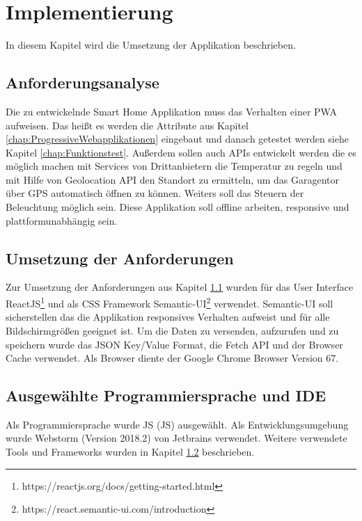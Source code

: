 \chapter{Implementierung}\label{chap:Implementierung}
\thispagestyle{standard}
\pagestyle{standard}

In diesem Kapitel wird die Umsetzung der Applikation beschrieben.

\section{Anforderungsanalyse}\label{sub:Anforderungsanalyse}
Die zu entwickelnde Smart Home Applikation muss das Verhalten einer \acs{PWA} aufweisen. Das heißt es werden die Attribute aus Kapitel \ref{chap:ProgressiveWebapplikationen} eingebaut und danach getestet werden siehe Kapitel \ref{chap:Funktionstest}. Außerdem sollen auch APIs entwickelt werden die es möglich machen mit Services von Drittanbietern die Temperatur zu regeln und mit Hilfe von Geolocation API den Standort zu ermitteln, um das Garagentor über GPS automatisch öffnen zu können. Weiters soll das Steuern der Beleuchtung möglich sein. Diese Applikation soll offline arbeiten, responsive und plattformunabhängig sein.

\section{Umsetzung der Anforderungen}\label{sub:Umsetzung der Anforderungen}
Zur Umsetzung der Anforderungen aus Kapitel \ref{sub:Anforderungsanalyse} wurden für das User Interface ReactJS\footnote{https://reactjs.org/docs/getting-started.html} und als CSS Framework Semantic-UI\footnote{https://react.semantic-ui.com/introduction} verwendet. Semantic-UI soll sicherstellen das die Applikation responsives Verhalten aufweist und für alle Bildschirmgrößen geeignet ist. Um die Daten zu versenden, aufzurufen und zu speichern wurde das JSON Key/Value Format, die Fetch API und der Browser Cache verwendet.
Als Browser diente der Google Chrome Browser Version 67.

\section{Ausgewählte Programmiersprache und IDE}
Als Programmiersprache wurde \acl{JS} (\acs{JS}) ausgewählt. 
Als Entwicklungsumgebung wurde Webstorm (Version 2018.2) von Jetbrains verwendet. 
Weitere verwendete Tools und Frameworks wurden in Kapitel \ref{sub:Umsetzung der Anforderungen} beschrieben.
\newpage
